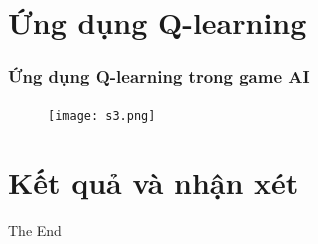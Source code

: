 \documentclass{beamer}
\begin{document}
\section{Ứng dụng Q-learning}
\begin{frame}
\frametitle{Ứng dụng Q-learning trong game AI }
\begin{figure}[H]
  \begin{center}
    \texttt{[image: s3.png]}
  \end{center}
  \label{s1}
\end{figure}
\end{frame}


\section{Kết quả và nhận xét}










\begin{frame}
\Huge{\centerline{The End}}
\end{frame}

\end{document}

